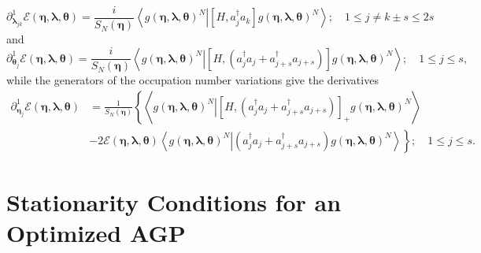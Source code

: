 \documentclass[aps,preprint]{revtex4}%
\begin{document}
\begin{equation}
\partial_{\bm{\lambda}_{jk}}^{1}\mathcal{E}\left(
\bm{\eta },\bm{\lambda},\bm{\theta}\right)  =\frac{i}{S_{N}\left(
\bm{\eta}\right)  }\left\langle \left.  g\left(
\bm{\eta },\bm{\lambda},\bm{\theta}\right)  ^{N}\right\vert \left[
H,a_{j}^{\dagger}a_{k}\right]  g\left(
\bm{\eta},\bm{\lambda },\bm{\theta}\right)  ^{N}\right\rangle ;\quad1\leq
j\neq k\pm s\leq2s \label{Dlamda}%
\end{equation}
and
\begin{equation}
\partial_{\bm{\theta}_{j}}^{1}\mathcal{E}\left(
\bm{\eta },\bm{\lambda},\bm{\theta}\right)  =\frac{i}{S_{N}\left(
\bm{\eta}\right)  }\left\langle \left.  g\left(
\bm{\eta },\bm{\lambda},\bm{\theta}\right)  ^{N}\right\vert \left[  H,\left(
a_{j}^{\dagger}a_{j}+a_{j+s}^{\dagger}a_{j+s}\right)  \right]  g\left(
\bm{\eta},\bm{\lambda},\bm{\theta}\right)  ^{N}\right\rangle ;\quad1\leq j\leq
s, \label{Dtheta}%
\end{equation}
while the generators of the occupation number variations give the derivatives
\begin{align}
\partial_{\bm{\eta}_{j}}^{1}\mathcal{E}\left(
\bm{\eta},\bm{\lambda},\bm{\theta}\right)   &  =\frac{1}{S_{N}\left(
\bm{\eta}\right)  }\left\{  \left\langle \left.  g\left(
\bm{\eta },\bm{\lambda},\bm{\theta}\right)  ^{N}\right\vert \left[  H,\left(
a_{j}^{\dagger}a_{j}+a_{j+s}^{\dagger}a_{j+s}\right)  \right]  _{+}g\left(
\bm{\eta},\bm{\lambda},\bm{\theta}\right)  ^{N}\right\rangle \right.
\nonumber\\
&  -\left.  2\mathcal{E}\left(  \bm{\eta},\bm{\lambda},\bm{\theta }\right)
\left\langle \left.  g\left(  \bm{\eta},\bm{\lambda },\bm{\theta}\right)
^{N}\right\vert \left(  a_{j}^{\dagger}a_{j}+a_{j+s}^{\dagger}a_{j+s}\right)
g\left(  \bm{\eta},\bm{\lambda },\bm{\theta}\right)  ^{N}\right\rangle
\right\}  ;\quad1\leq j\leq s. \label{Deta}%
\end{align}


\section{Stationarity Conditions for an Optimized AGP\label{StatAGPCond}}
\end{document}
